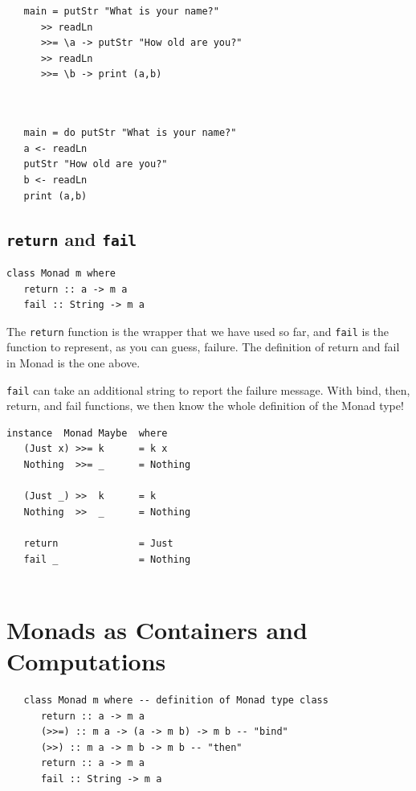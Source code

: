 \begin{paracol}{2}
   
   \begin{lstlisting}
   main = putStr "What is your name?"
      >> readLn
      >>= \a -> putStr "How old are you?"
      >> readLn
      >>= \b -> print (a,b)
      
   \end{lstlisting}
   
   \switchcolumn
\begin{lstlisting}
   
   main = do putStr "What is your name?"
   a <- readLn
   putStr "How old are you?"
   b <- readLn
   print (a,b)
\end{lstlisting}
   
\end{paracol}

\subsection{\texttt{return} and \texttt{fail}}
\begin{lstlisting}
class Monad m where
   return :: a -> m a
   fail :: String -> m a 
\end{lstlisting}
The \lstinline|return| function is the wrapper that we have used so far, and \lstinline|fail| is the function to represent, as you can guess, failure. The definition of return and fail in Monad is the one above.

\lstinline|fail| can take an additional string to report the failure message. With bind, then, return, and fail functions, we then know the whole definition of the Monad type!

\begin{lstlisting}
instance  Monad Maybe  where
   (Just x) >>= k      = k x
   Nothing  >>= _      = Nothing

   (Just _) >>  k      = k
   Nothing  >>  _      = Nothing

   return              = Just
   fail _              = Nothing


\end{lstlisting}

\section{Monads as Containers and Computations}
\begin{lstlisting}
   class Monad m where -- definition of Monad type class
      return :: a -> m a
      (>>=) :: m a -> (a -> m b) -> m b -- "bind"
      (>>) :: m a -> m b -> m b -- "then"
      return :: a -> m a
      fail :: String -> m a
\end{lstlisting}
